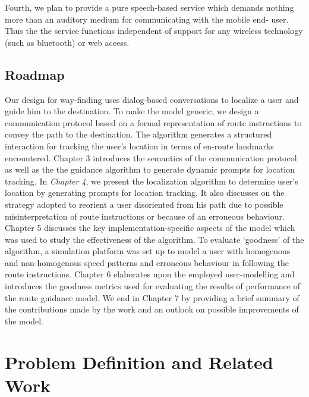 \documentclass{iitkthesis}
\begin{document}
Fourth, we plan to provide a pure speech-based service which demands 
nothing more than an auditory medium for communicating with the mobile end-
user. Thus the the service functions independent of 
support for any wireless technology (such as bluetooth) or web access.
  \section{Roadmap}
Our design for way-finding uses dialog-based conversations to localize a 
user and guide him to the destination. To make the model generic, we design 
a communication protocol based on a formal representation of route instructions
to convey the path to the destination. The algorithm generates
a structured interaction for tracking the user's 
location in terms of en-route landmarks encountered. Chapter 3 introduces 
the semantics of the communication protocol as well as the the guidance 
algorithm to generate dynamic prompts for location tracking. 
In \textit{Chapter 4}, we present the localization algorithm to determine user's location by generating prompts for location tracking. It also discusses on the strategy adopted to reorient a user disoriented from his path due to possible misinterpretation of route instructions or because of an erroneous behaviour. 
Chapter 5 discusses the key implementation-specific aspects of the 
model which was used to study the effectiveness of the algorithm. To 
evaluate `goodness' of the algorithm, a simulation platform was set up to 
model a user with homogenous and non-homogenous speed patterns and 
erroneous behaviour in following the route instructions. Chapter 6 elaborates 
upon the employed user-modelling and introduces the goodness metrics used for 
evaluating the results of performance of the route guidance model. We end in 
Chapter 7 by providing a brief summary of the contributions made by the work
and an outlook on possible improvements of the model.

 \chapter{Problem Definition and Related Work}
\end{document}
